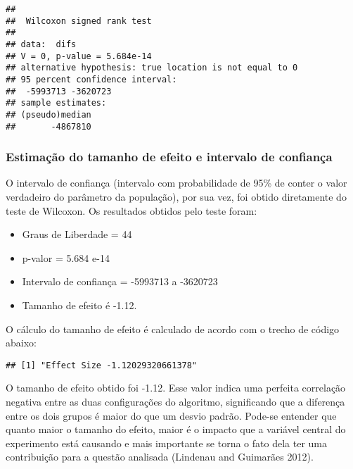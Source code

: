 \documentclass[]{article}
\newenvironment{Shaded}{\begin{snugshade}}{\end{snugshade}}
\newcommand{\DecValTok}[1]{\textcolor[rgb]{0.00,0.00,0.81}{#1}}
\newcommand{\KeywordTok}[1]{\textcolor[rgb]{0.13,0.29,0.53}{\textbf{#1}}}
\newcommand{\NormalTok}[1]{#1}
\newcommand{\OperatorTok}[1]{\textcolor[rgb]{0.81,0.36,0.00}{\textbf{#1}}}
\newcommand{\StringTok}[1]{\textcolor[rgb]{0.31,0.60,0.02}{#1}}
\providecommand{\tightlist}{%
  \setlength{\itemsep}{0pt}\setlength{\parskip}{0pt}}
\begin{document}
\begin{verbatim}
## 
##  Wilcoxon signed rank test
## 
## data:  difs
## V = 0, p-value = 5.684e-14
## alternative hypothesis: true location is not equal to 0
## 95 percent confidence interval:
##  -5993713 -3620723
## sample estimates:
## (pseudo)median 
##       -4867810
\end{verbatim}

\hypertarget{estimacao-do-tamanho-de-efeito-e-intervalo-de-confianca}{%
\subsubsection{Estimação do tamanho de efeito e intervalo de
confiança}\label{estimacao-do-tamanho-de-efeito-e-intervalo-de-confianca}}

O intervalo de confiança (intervalo com probabilidade de 95\% de conter
o valor verdadeiro do parâmetro da população), por sua vez, foi obtido
diretamente do teste de Wilcoxon. Os resultados obtidos pelo teste
foram:

\begin{itemize}
\tightlist
\item
  Graus de Liberdade = 44
\item
  p-valor = 5.684 e-14
\item
  Intervalo de confiança = -5993713 a -3620723
\item
  Tamanho de efeito é -1.12.
\end{itemize}

O cálculo do tamanho de efeito é calculado de acordo com o trecho de
código abaixo:

\begin{Shaded}
\end{Shaded}

\begin{verbatim}
## [1] "Effect Size -1.12029320661378"
\end{verbatim}

O tamanho de efeito obtido foi -1.12. Esse valor indica uma perfeita
correlação negativa entre as duas configurações do algoritmo,
significando que a diferença entre os dois grupos é maior do que um
desvio padrão. Pode-se entender que quanto maior o tamanho do efeito,
maior é o impacto que a variável central do experimento está causando e
mais importante se torna o fato dela ter uma contribuição para a questão
analisada (Lindenau and Guimarães 2012).
\end{document}
